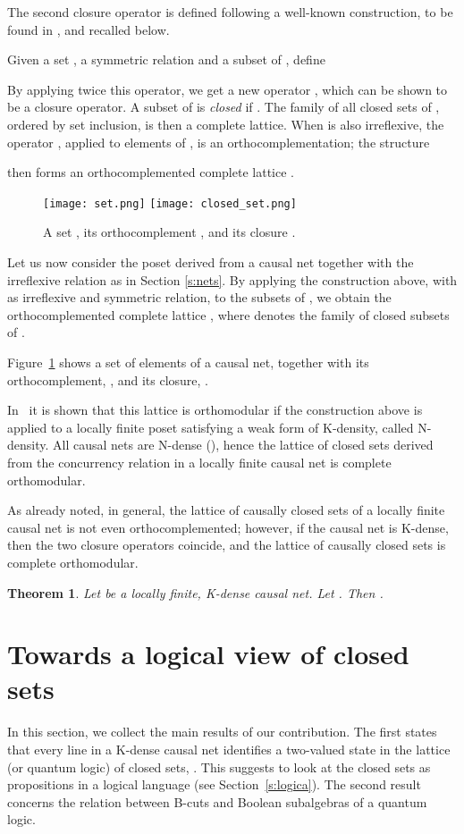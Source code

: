 \documentclass{eptcs}
\newtheorem{theorem}{Theorem}
\begin{document}
The second closure operator is defined following a well-known
construction, to be found in \cite{B79}, and recalled below.

Given a set , a symmetric relation 
and a subset  of , define

By applying twice this operator,
we get a new operator , which can be shown to be
a closure operator.
A subset  of  is \emph{closed}  
if . The family  of all closed sets of , ordered
by set inclusion, is then a complete lattice.
When  is also irreflexive, 
the operator , applied to elements of ,
is an orthocomplementation; the structure
 
then forms an orthocomplemented complete lattice \cite{B79}. 
\begin{figure}
  \begin{center}
\texttt{[image: set.png]}
\texttt{[image: closed\_set.png]}
  \end{center}
  \caption{A set , its orthocomplement ,
           and its closure .}\label{f:setclosure}
\end{figure}
Let us now consider the poset  derived from a causal net
 together with the irreflexive relation  as in Section
\ref{s:nets}. By applying the
construction above, with  as irreflexive and symmetric
relation, to the subsets of , we
obtain the orthocomplemented complete lattice
, where  denotes the family
of closed subsets of .

Figure~\ref{f:setclosure} shows a set  of elements of
a causal net, together with its orthocomplement, ,
and its closure, .

In~\cite{BPR10} it is shown that this lattice is orthomodular if the
construction above is applied to a locally finite poset satisfying
a weak form of
K-density, called N-density. All causal nets are N-dense (\cite{BF88}),
hence the lattice of closed sets derived from the concurrency relation
in a locally finite causal net is complete orthomodular.

As already noted, in general, the lattice of causally closed sets of a locally finite
causal net is not even orthocomplemented; however, if the causal net
is K-dense, then the two closure operators coincide, and the lattice
of causally closed sets is complete orthomodular.
\begin{theorem} \label{t:chiusieCC}\cite{BPR10}
Let  be a locally finite, K-dense causal net.
Let  .
Then .
\end{theorem}
\section{Towards a logical view of closed sets}\label{s:results}
In this section, we collect the main results of our
contribution. The first states that every line in a
K-dense causal net  identifies a two-valued state in
the lattice (or quantum logic) of closed sets, .
This suggests to look at the closed sets as propositions
in a logical language (see Section~\ref{s:logica}).
The second result concerns the relation between B-cuts
and Boolean subalgebras of a quantum logic.
\end{document}
